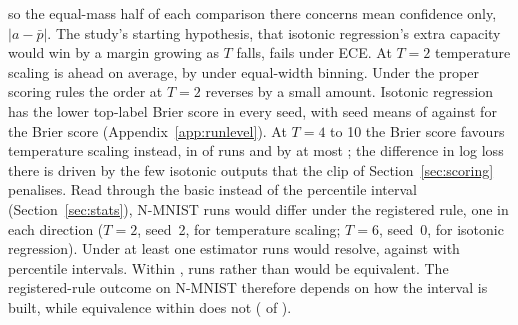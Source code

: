\documentclass[10pt]{article}
\begin{document}
so the equal-mass half of each comparison there concerns mean confidence only, $|a-\bar p|$. The study's starting hypothesis, that
isotonic regression's extra capacity would win by a margin growing as $T$ falls, fails under ECE.
At $T=2$ temperature scaling is ahead on average, by \isoMinusTempTwoW{} under equal-width %
binning. Under the proper scoring rules the order at $T=2$ reverses by a small amount. Isotonic
regression has the lower top-label Brier score in every seed, with seed means of %
\brierNmTwoIso{} against \brierNmTwoTemp{} for the Brier score (Appendix~\ref{app:runlevel}). %
At $T=4$ to 10 the Brier score favours temperature scaling instead, in \brierTempBetterNmHigh{} of %
\brierRunsNmHigh{} runs and by at most \brierDiffNmHighMax; the difference in log loss there is %
driven by the few isotonic outputs that the clip of Section~\ref{sec:scoring} penalises.
Read through the basic instead of the percentile interval (Section~\ref{sec:stats}),
\tostNmDifferBasic{} N-MNIST runs would differ under the registered rule, one in each %
direction ($T=2$, seed~2, for temperature scaling; $T=6$, seed~0, for isotonic regression). %
Under at least one estimator \tostNmEitherBasic{} runs would resolve, against \tostNmEither{} with %
percentile intervals. Within \deltaStrict, \tostNmBothBasicStrict{} runs rather than \tostNmBothStrict{} would be equivalent. %
The registered-rule outcome on N-MNIST therefore depends on how the interval is built, while
equivalence within \deltaMid{} does not (\tostNmBothBasicMid{} of \tostNmRuns). %
\end{document}
